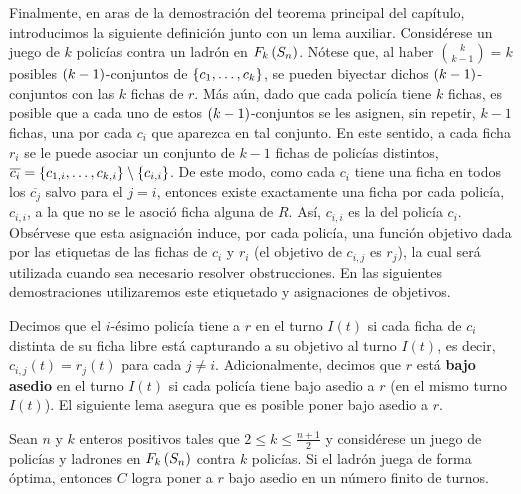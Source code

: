 Finalmente, en aras de la demostraci\'on del teorema principal del cap\'itulo,
introducimos la siguiente definici\'on junto con un lema auxiliar. Consid\'erese
un juego de $k$ polic\'ias contra un ladr\'on en $F_{k}\left( S_{n}\right)$. N\'otese que,
al haber $\binom{k}{k-1}=k$ posibles $\left( k-1\right)$-conjuntos de $\left\{ c_1,\dots,
c_k\right\}$, se pueden biyectar dichos $\left( k-1\right)$-conjuntos con las $k$ fichas de
$r$. M\'as a\'un, dado que cada polic\'ia tiene $k$ fichas, es posible que a
cada uno de estos $\left( k-1\right)$-conjuntos se les asignen, sin repetir, $k-1$
fichas, una por cada $c_i$ que aparezca en tal conjunto. En este sentido, a cada
ficha $r_i$ se le puede asociar un conjunto de $k-1$ fichas de polic\'ias
distintos, $\overline{c_i}=\left\{ c_{1,i},\dots,c_{k,i}\right\}\setminus\left\{ c_{i,i}\right\}$. De
este modo, como cada $c_i$ tiene una ficha en todos los $\overline{c_j}$ salvo
para el $j=i$, entonces existe exactamente una ficha por cada polic\'ia,
$c_{i,i}$, a la que no se le asoci\'o ficha alguna de $R$. As\'i, $c_{i,i}$ es
la  del polic\'ia $c_i$. Obs\'ervese que esta asignaci\'on
induce, por cada polic\'ia, una funci\'on objetivo dada por las etiquetas de las
fichas de $c_i$ y $r_i$ (el objetivo de $c_{i,j}$ es $r_j$), la cual ser\'a
utilizada cuando sea necesario resolver obstrucciones. En las siguientes
demostraciones utilizaremos este etiquetado y asignaciones de objetivos.

Decimos que el $i$-\'esimo polic\'ia tiene  a $r$ en el
turno $I(t)$ si cada ficha de $c_i$ distinta de su ficha libre est\'a capturando
a su objetivo al turno $I(t)$, es decir, $c_{i,j}(t)=r_j(t)$ para cada $j \neq
i$. Adicionalmente, decimos que $r$ est\'a \textbf{bajo asedio} en el turno
$I(t)$ si cada polic\'ia tiene bajo asedio a $r$ (en el mismo turno $I(t)$). El
siguiente lema asegura que es posible poner bajo asedio a $r$.

\begin{lema}
\label{lem:Instancia_capturas}
    Sean $n$ y $k$ enteros positivos tales que $2\leq k\leq \frac{n+1}{2}$ y
    consid\'erese un juego de polic\'ias y ladrones en $F_{k}\left( S_n\right)$ contra $k$
    polic\'ias. Si el ladr\'on juega de forma \'optima, entonces $C$ logra poner
    a $r$ bajo asedio en un n\'umero finito de turnos.
\end{lema}

